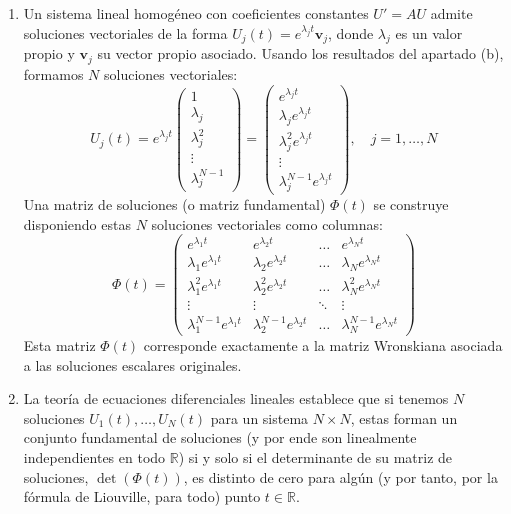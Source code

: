 {\begin{enumerate}
        \item[(c)] Un sistema lineal homogéneo con coeficientes constantes $U' = AU$ admite soluciones vectoriales de la forma $U_j(t) = e^{\lambda_j t} \mathbf{v}_j$, donde $\lambda_j$ es un valor propio y $\mathbf{v}_j$ su vector propio asociado. 
        Usando los resultados del apartado (b), formamos $N$ soluciones vectoriales:
        $$U_j(t) = e^{\lambda_j t} \begin{pmatrix} 1 \\ \lambda_j \\ \lambda_j^2 \\ \vdots \\ \lambda_j^{N-1} \end{pmatrix} = \begin{pmatrix} e^{\lambda_j t} \\ \lambda_j e^{\lambda_j t} \\ \lambda_j^2 e^{\lambda_j t} \\ \vdots \\ \lambda_j^{N-1} e^{\lambda_j t} \end{pmatrix}, \quad j = 1, \dots, N$$
        Una matriz de soluciones (o matriz fundamental) $\Phi(t)$ se construye disponiendo estas $N$ soluciones vectoriales como columnas:
        $$\Phi(t) = \begin{pmatrix}
            e^{\lambda_1 t} & e^{\lambda_2 t} & \dots & e^{\lambda_N t} \\
            \lambda_1 e^{\lambda_1 t} & \lambda_2 e^{\lambda_2 t} & \dots & \lambda_N e^{\lambda_N t} \\
            \lambda_1^2 e^{\lambda_1 t} & \lambda_2^2 e^{\lambda_2 t} & \dots & \lambda_N^2 e^{\lambda_N t} \\
            \vdots & \vdots & \ddots & \vdots \\
            \lambda_1^{N-1} e^{\lambda_1 t} & \lambda_2^{N-1} e^{\lambda_2 t} & \dots & \lambda_N^{N-1} e^{\lambda_N t}
        \end{pmatrix}$$
        Esta matriz $\Phi(t)$ corresponde exactamente a la matriz Wronskiana asociada a las soluciones escalares originales.

        \item[(d)] La teoría de ecuaciones diferenciales lineales establece que si tenemos $N$ soluciones $U_1(t), \dots, U_N(t)$ para un sistema $N \times N$, estas forman un conjunto fundamental de soluciones (y por ende son linealmente independientes en todo $\mathbb{R}$) si y solo si el determinante de su matriz de soluciones, $\det(\Phi(t))$, es distinto de cero para algún (y por tanto, por la fórmula de Liouville, para todo) punto $t \in \mathbb{R}$.


\end{enumerate}}
